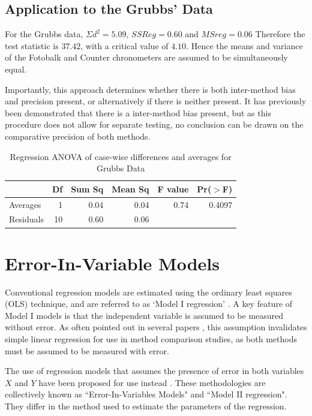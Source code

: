 \documentclass[12pt, a4paper]{report}
\theoremstyle{plain}
\theoremstyle{definition}
\theoremstyle{remark}
\begin{document}
	
	\subsection{Application to the Grubbs' Data}
	For the Grubbs data, $\Sigma d^{2}=5.09 $, $SSReg = 0.60$ and
	$MSreg=0.06$ Therefore the test statistic is $37.42$, with a
	critical value of $4.10$. Hence the means and variance of the
	Fotobalk and Counter chronometers are assumed to be simultaneously
	equal.
	
	Importantly, this approach determines whether there is both
	inter-method bias and precision present, or alternatively if there
	is neither present. It has previously been demonstrated that there
	is a inter-method bias present, but as this procedure does not
	allow for separate testing, no conclusion can be drawn on the
	comparative precision of both methods.
	
	
	
	\begin{table}[ht]
		\begin{center}
			\begin{tabular}{lrrrrr}
				\hline
				& Df & Sum Sq & Mean Sq & F value & Pr($>$F) \\
				\hline
				Averages & 1 & 0.04 & 0.04 & 0.74 & 0.4097 \\
				Residuals & 10 & 0.60 & 0.06 &  &  \\
				\hline
			\end{tabular}
			\caption{Regression ANOVA of case-wise differences and averages
				for Grubbs Data}
		\end{center}
	\end{table}
	
	


\section{Error-In-Variable Models}
Conventional regression models are estimated using the ordinary
least squares (OLS) technique, and are referred to as `Model I
regression' \citep{CornCoch,ludbrook97}. A key feature of Model I
models is that the independent variable is assumed to be measured
without error. As often pointed out in several papers
\citep{BA83,ludbrook97}, this assumption invalidates simple linear
regression for use in method comparison studies, as both methods
must be assumed to be measured with error.

The use of regression models that assumes the presence of error in
both variables $X$ and $Y$ have been proposed for use instead
\citep{CornCoch,ludbrook97}. These methodologies are collectively
known as ``Error-In-Variables Models" and ``Model II regression". They differ in the method used to
estimate the parameters of the regression.
\end{document}
